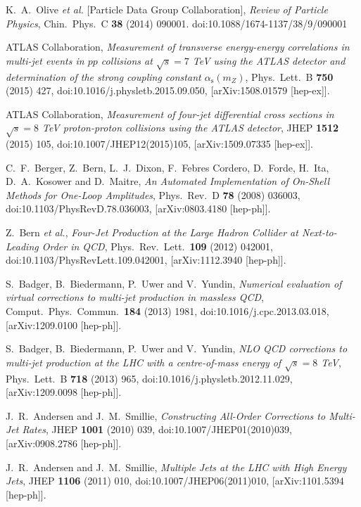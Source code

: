 \documentclass{PoS}
\begin{document}
\begin{thebibliography}{99}
  K.~A.~Olive {\it et al.} [Particle Data Group Collaboration],
  {\it Review of Particle Physics},
  Chin.\ Phys.\ C {\bf 38} (2014) 090001.
  doi:10.1088/1674-1137/38/9/090001

  ATLAS Collaboration,
  {\it Measurement of transverse energy-energy correlations in multi-jet events in $pp$ collisions at $\sqrt{s} = 7$ TeV using the ATLAS detector and determination of the strong coupling constant $\alpha_{\mathrm{s}}(m_Z)$},
  Phys.\ Lett.\ B {\bf 750} (2015) 427,
  doi:10.1016/j.physletb.2015.09.050,
  [arXiv:1508.01579 [hep-ex]]. 

  ATLAS Collaboration,
  {\it Measurement of four-jet differential cross sections in $\sqrt{s}=8$ TeV proton-proton collisions using the ATLAS detector},
  JHEP {\bf 1512} (2015) 105,
  doi:10.1007/JHEP12(2015)105,
  [arXiv:1509.07335 [hep-ex]].

  C.~F.~Berger, Z.~Bern, L.~J.~Dixon, F.~Febres Cordero, D.~Forde, H.~Ita, D.~A.~Kosower and D.~Maitre,
  {\it An Automated Implementation of On-Shell Methods for One-Loop Amplitudes},
  Phys.\ Rev.\ D {\bf 78} (2008) 036003,
  doi:10.1103/PhysRevD.78.036003,
  [arXiv:0803.4180 [hep-ph]].

  Z.~Bern {\it et al.},
  {\it Four-Jet Production at the Large Hadron Collider at Next-to-Leading Order in QCD},
  Phys.\ Rev.\ Lett.\  {\bf 109} (2012) 042001,
  doi:10.1103/PhysRevLett.109.042001,
  [arXiv:1112.3940 [hep-ph]].

  S.~Badger, B.~Biedermann, P.~Uwer and V.~Yundin,
  {\it Numerical evaluation of virtual corrections to multi-jet production in massless QCD},
  Comput.\ Phys.\ Commun.\  {\bf 184} (2013) 1981,
  doi:10.1016/j.cpc.2013.03.018,
  [arXiv:1209.0100 [hep-ph]].

  S.~Badger, B.~Biedermann, P.~Uwer and V.~Yundin,
  {\it NLO QCD corrections to multi-jet production at the LHC with a centre-of-mass energy of $\sqrt{s}=8$ TeV},
  Phys.\ Lett.\ B {\bf 718} (2013) 965,
  doi:10.1016/j.physletb.2012.11.029,
  [arXiv:1209.0098 [hep-ph]].

  J.~R.~Andersen and J.~M.~Smillie,
  {\it Constructing All-Order Corrections to Multi-Jet Rates},
  JHEP {\bf 1001} (2010) 039,
  doi:10.1007/JHEP01(2010)039,
  [arXiv:0908.2786 [hep-ph]].

  J.~R.~Andersen and J.~M.~Smillie,
  {\it Multiple Jets at the LHC with High Energy Jets},
  JHEP {\bf 1106} (2011) 010,
  doi:10.1007/JHEP06(2011)010,
  [arXiv:1101.5394 [hep-ph]].


\end{thebibliography}
\end{document}
